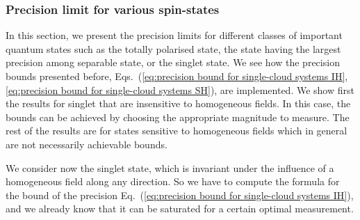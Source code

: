 
\subsubsection{Precision limit for various spin-states}

In this section, we present the precision limits for different classes of
important quantum states such as the totally polarised state,
the state having the largest precision among separable state,
or the singlet state.
We see how the precision bounds presented before, Eqs.~(\ref{eq:precision
bound for single-cloud systems IH}, \ref{eq:precision bound for single-cloud
systems SH}), are implemented.
We show first the results for singlet that are insensitive to homogeneous
fields.
In this case, the bounds can be achieved by choosing
the appropriate magnitude to measure.
The rest of the results are for states sensitive to homogeneous
fields which in general are not necessarily achievable bounds.


We consider now the singlet state, which is invariant under the influence
of a homogeneous field along any direction.
So we have to compute the formula for the bound
of the precision Eq.~(\ref{eq:precision bound for single-cloud systems IH}),
and we already know that it can be saturated for a
certain optimal measurement.

